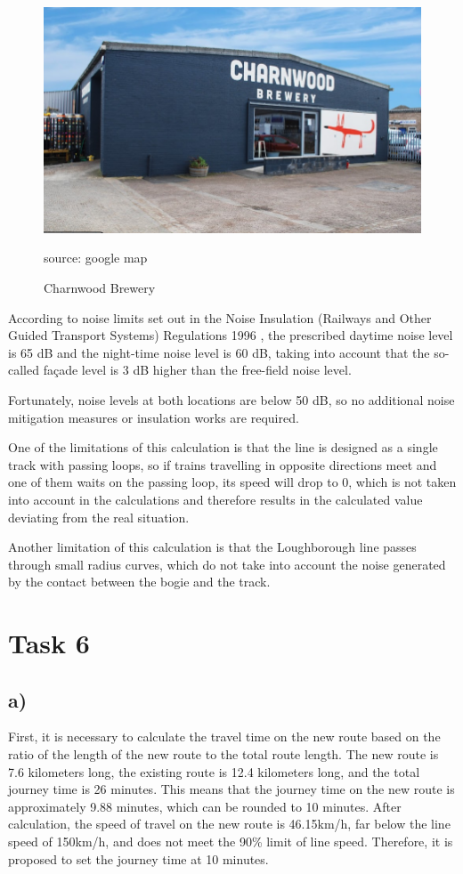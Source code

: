 \documentclass[letterpaper,12pt,leqno]{article}
\begin{document}
	\begin{figure}[H]
		\centering
		\includegraphics[width=0.7\linewidth]{brewery}
		\caption{Charnwood Brewery}
		\small{source: google map}
		\label{fig:brewery}
	\end{figure}
	
	According to noise limits set out in the Noise Insulation (Railways and Other Guided Transport Systems) Regulations 1996 \citep{ukgov_noise_insulation_1996}, the prescribed daytime noise level is 65 dB and the night-time noise level is 60 dB, taking into account that the so-called façade level is 3 dB higher than the free-field noise level.
	
	Fortunately, noise levels at both locations are below 50 dB, so no additional noise mitigation measures or insulation works are required.
	
	One of the limitations of this calculation is that the line is designed as a single track with passing loops, so if trains travelling in opposite directions meet and one of them waits on the passing loop, its speed will drop to 0, which is not taken into account in the calculations and therefore results in the calculated value deviating from the real situation. 
	
	Another limitation of this calculation is that the Loughborough line passes through small radius curves, which do not take into account the noise generated by the contact between the bogie and the track.

\section{Task 6}
\subsection{a)}
First, it is necessary to calculate the travel time on the new route based on the ratio of the length of the new route to the total route length. The new route is 7.6 kilometers long, the existing route is 12.4 kilometers long, and the total journey time is 26 minutes. This means that the journey time on the new route is approximately 9.88 minutes, which can be rounded to 10 minutes. After calculation, the speed of travel on the new route is 46.15km/h, far below the line speed of 150km/h, and does not meet the 90\% limit of line speed. Therefore, it is proposed to set the journey time at 10 minutes.
\end{document}
